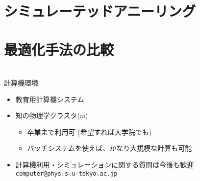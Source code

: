 \documentclass[10pt,dvipdfmx]{beamer}
\begin{document}




\section{シミュレーテッドアニーリング}







\section{最適化手法の比較}








\section{}

\begin{frame}[t,fragile]{計算機環境}
  \begin{itemize}
  \item 教育用計算機システム
  \item 知の物理学クラスタ(ai)
    \begin{itemize}
    \item 卒業まで利用可 (希望すれば大学院でも)
    \item バッチシステムを使えば、かなり大規模な計算も可能
    \end{itemize}
  \item 計算機利用・シミュレーションに関する質問は今後も歓迎 {\tt computer@phys.s.u-tokyo.ac.jp}
  \end{itemize}
\end{frame}


\end{document}
